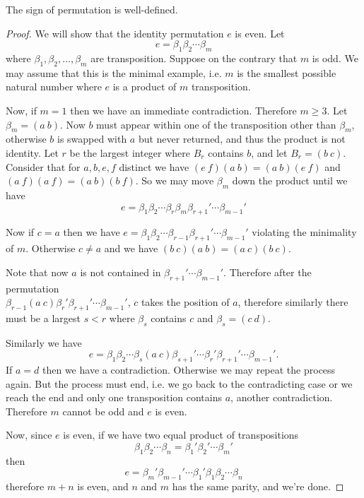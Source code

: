 \documentclass[12pt]{article}
\begin{document}
	\begin{theorem}
		The sign of permutation is well-defined.
	\end{theorem}
	\begin{proof}
		We will show that the identity permutation $e$ is even. Let 
		$$e=\beta_1\beta_2\cdots \beta_m$$
		where $\beta_1,\beta_2,\dots,\beta_m$ are transposition. Suppose on the contrary that $m$ is odd. We may assume that this is the minimal example, i.e. $m$ is the smallest possible natural number where $e$ is a product of $m$ transposition.

		Now, if $m=1$ then we have an immediate contradiction. Therefore $m\geq 3$. Let $\beta_m = (a\ b)$. Now $b$ must appear within one of the transposition other than $\beta_m$, otherwise $b$ is swapped with $a$ but never returned, and thus the product is not identity. Let $r$ be the largest integer where $B_r$ contains $b$, and let $B_r = (b\ c)$. Consider that for $a,b,e,f$ distinct we have $(e\ f)(a\ b) = (a\ b)(e\ f)$ and $(a\ f)(a\ f) = (a\ b)(b\ f)$. So we may move $\beta_m$ down the product until we have
		$$e=\beta_1\beta_2\cdots\beta_r\beta_m\beta_{r+1}'\cdots\beta_{m-1}'$$

		Now if $c=a$ then we have $e=\beta_1\beta_2\cdots \beta_{r-1}\beta_{r+1}'\cdots \beta_{m-1}'$ violating the minimality of $m$. Otherwise $c\neq a$ and we have $(b\ c)(a\ b) = (a\ c)(b\ c)$.

		Note that now $a$ is not contained in $\beta_{r+1}'\cdots\beta_{m-1}'$. Therefore after the permutation \\$\beta_{r-1}(a\ c)\beta_r '\beta_{r+1}'\cdots \beta_{m-1}'$, $c$ takes the position of $a$, therefore similarly there must be a largest $s<r$ where $\beta_s$ contains $c$ and $\beta_s = (c\ d)$.

		Similarly we have
		$$e=\beta_1\beta_2\cdots\beta_s(a\ c)\beta_{s+1}'\cdots\beta_r'\beta_{r+1}'\cdots\beta_{m-1}'.$$ 
		If $a=d$ then we have a contradiction. Otherwise we may repeat the process again. But the process must end, i.e. we go back to the contradicting case or we reach the end and only one transposition contains $a$, another contradiction. Therefore $m$ cannot be odd and $e$ is even.

		Now, since $e$ is even, if we have two equal product of transpositions
		$$\beta_1\beta_2\cdots\beta_n = \beta_1'\beta_2'\cdots\beta_m'$$
		then
		$$e = \beta_m'\beta_{m-1}'\cdots\beta_1'\beta_1\beta_2\cdots\beta_n$$
		therefore $m+n$ is even, and $n$ and $m$ has the same parity, and we're done.
	\end{proof}
\end{document}

